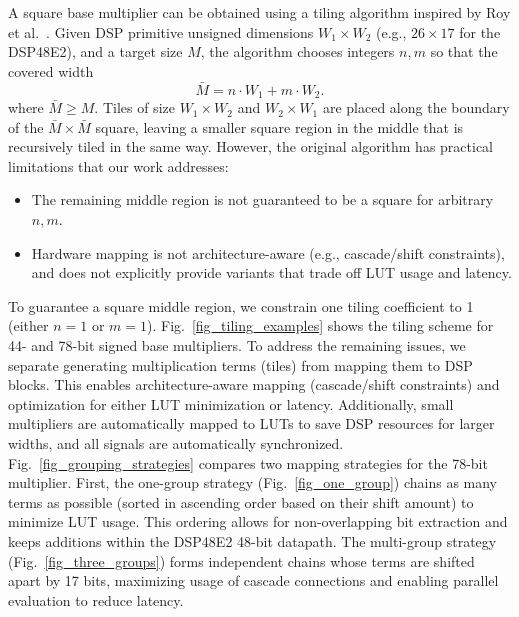 \documentclass[conference]{IEEEtran}
\begin{document}
A square base multiplier can be obtained using a tiling algorithm inspired by Roy et al.~\cite{royTileMultiplicationEfficient2014}.
Given DSP primitive unsigned dimensions $W_1\times W_2$ (e.g., $26\times17$ for the DSP48E2), and a target size $M$,  the algorithm chooses integers $n,m$ so that the covered width
\[
\bar{M} = n \cdot  W_1  + m \cdot W_2 .
\]
where $\bar{M} \geq M$.
Tiles of size $W_1\times W_2$ and $W_2\times W_1$ are placed along the boundary of the $\bar{M}\times\bar{M}$ square, leaving a smaller square region in the middle that is recursively tiled in the same way.
However, the original algorithm has practical limitations that our work addresses:
\begin{itemize}
    \item The remaining middle region is not guaranteed to be a square for arbitrary $n,m$.
    \item Hardware mapping is not architecture-aware (e.g., cascade/shift constraints), and does not explicitly provide variants that trade off LUT usage and latency.
\end{itemize}

To guarantee a square middle region, we constrain one tiling coefficient to 1 (either $n=1$ or $m=1$).
Fig.~\ref{fig_tiling_examples} shows the tiling scheme for 44- and 78-bit signed base multipliers.
To address the remaining issues, we separate generating multiplication terms (tiles) from mapping them to DSP blocks.
This enables architecture-aware mapping (cascade/shift constraints) and optimization for either LUT minimization or latency.
Additionally, small multipliers are automatically mapped to LUTs to save DSP resources for larger widths, and all signals are automatically synchronized.
Fig.~\ref{fig_grouping_strategies} compares two mapping strategies for the 78-bit multiplier.
First, the one-group strategy (Fig.~\ref{fig_one_group}) chains as many terms as possible (sorted in ascending order based on their shift amount) to minimize LUT usage. 
This ordering allows for non-overlapping bit extraction and keeps additions within the DSP48E2 48-bit datapath.
The multi-group strategy (Fig.~\ref{fig_three_groups}) forms independent chains whose terms are shifted apart by 17 bits, maximizing usage of cascade connections and enabling parallel evaluation to reduce latency.
\end{document}
